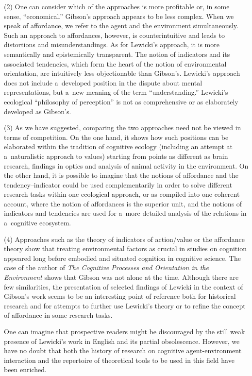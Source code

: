 \documentclass[%
manuscript=article,
year=2024,
volume=77,
doi=00000.000,
]{zfn}
\begin{document}
(2) One can consider which of the approaches is more profitable or, in some sense, ``economical.'' Gibson's approach appears to be less complex. When we speak of affordance, we refer to the agent and the environment simultaneously. Such an approach to affordances, however, is counterintuitive and leads to distortions and misunderstandings. As for Lewicki's approach, it is more semantically and epistemically transparent. The notion of indicators and its associated tendencies, which form the heart of the notion of environmental orientation, are intuitively less objectionable than Gibson's. Lewicki's approach does not include a~developed position in the dispute about mental representations, but a~new meaning of the term ``understanding.'' Lewicki's ecological ``philosophy of perception'' is not as comprehensive or as elaborately developed as Gibson's.



(3) As we have suggested, comparing the two approaches need not be viewed in terms of competition. On the one hand, it shows how such positions can be elaborated within the tradition of cognitive ecology (including an attempt at a~naturalistic approach to values) starting from points as different as brain research, findings in optics and analysis of animal activity in the environment. On the other hand, it is possible to imagine that the notions of affordance and the tendency–indicator could be used complementarily in order to solve different research tasks within one ecological approach, or as compiled into one coherent account, where the notion of affordances is the superior unit, and the notions of indicators and tendencies are used for a~more detailed analysis of the relations in a~cognitive ecosystem.



(4) Approaches such as the theory of indicators of action/value or the affordance theory show that treating environmental factors as crucial in studies on cognition appeared long before embodied and situated cognition in cognitive science. The case of the author of \textit{The Cognitive Processes and Orientation in the Environment} shows that Gibson was not alone at the time. Although there are few similarities, the presentation of selected findings of Lewicki in the context of Gibson's work seems to be an interesting point of reference both for historical research and for attempts to further use Lewicki's theory or to refine the concept of affordance in some research tasks.



One can imagine that prospective readers might be discouraged by the still weak presence of Lewicki's work in English and its partial obsolescence. However, we have no doubt that both the history of research on cognitive agent-environment interaction and the repertoire of theoretical tools to be used in this field have been enriched.




\printbibliography
\end{document}

